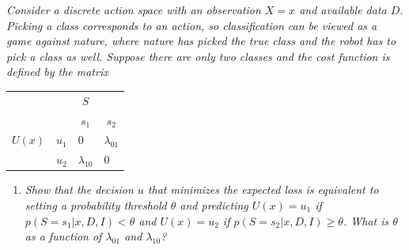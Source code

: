 \begin{example}
	\emph{Consider a discrete action space with an observation $X=x$ and available data $D$. Picking a class corresponds to an action, so classification can be viewed as a game against nature, where nature has picked the true class and the robot has to pick a class as well. Suppose there are only two classes and the cost function is defined by the matrix}
	\begin{center}
		\begin{tabular}{ c  c  c  c }
			&& $S$& \\
			&& $s_1$ & $s_2$  \\
			\cline{3-4}
			$U(x)$ & $u_1$& \multicolumn{1}{|l}{$0$} &\multicolumn{1}{l|}{$\lambda_{01}$}  \\
			& $u_2$& \multicolumn{1}{|l}{$\lambda_{10}$} & \multicolumn{1}{l|}{0} \\
			\cline{3-4}
		\end{tabular}
	\end{center}
	\begin{enumerate}
		\item \emph{Show that the decision $u$ that minimizes the expected loss is equivalent to setting a probability threshold $\theta$ and predicting $U(x)=u_1$ if $p(S=s_1|x,D,I) < \theta$ and $U(x)=u_2$ if $p(S=s_2|x,D,I)\geq \theta$. What is $\theta$ as a function of $\lambda_{01}$ and $\lambda_{10}$?}\newline
		

\end{enumerate}
\end{example}
